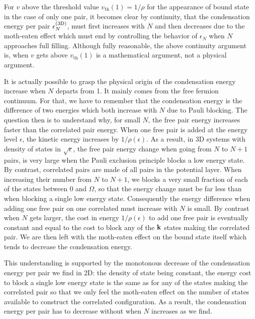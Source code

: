 \documentclass[aps,prb,showpacs,reprint]{revtex4-1}
\begin{document}
\subsubsection{}
For $v$ above the threshold value $v_{\text{th}}(1)=1/\rho$ for the appearance of bound state in the case of only one pair, it becomes  clear by continuity, that the condensation energy per pair $\epsilon^{{\text{(3D)}}}_N$, must first increases with $N$ and then decreases due to the moth-eaten effect which must end by controlling the behavior of $\epsilon_N$ when $N$ approaches full filling.  Although fully reasonable, the above continuity argument is, when $v$ gets above $v_{\text{th}}(1)$ is a mathematical argument, not a physical argument. 

It is actually possible to grasp the physical origin of the condensation energy increase when $N$ departs from 1.  It mainly comes from the free fermion continuum.  For that, we have to remember that the condensation energy is the difference of two energies which both increase with $N$ due to Pauli blocking.  The question then is to understand why, for small $N$, the free pair energy increases faster than the correlated pair energy.  When one free pair is added at the energy level $\epsilon$, the kinetic energy increases by $1/\rho(\epsilon)$.  As a result, in 3D systems with density of states in $\sqrt{\epsilon}$, the free pair energy change when going from $N$ to $N+1$ pairs, is very large when the Pauli exclusion principle blocks a low energy state.  By contrast, correlated pairs are made of all pairs in the potential layer. When increasing their number from $N$ to $N+1$, we blocks a very small fraction of each of the states between $0$ and $\Omega$, so that the energy change must be far less than when blocking a single low energy state.  Consequently the energy difference when adding one free pair on one correlated must increase with $N$ is small. By contrast when $N$ gets larger, the cost in energy $1/\rho(\epsilon)$ to add one free pair is eventually constant and equal to the cost to block any of the $\mathbf{k}$ states making the correlated pair.  We are then left with the moth-eaten effect on the bound state itself which tends to decrease the condensation energy. 

This understanding is supported by the monotonous decrease of the condensation energy per pair we find in 2D: the density of state being constant, the energy cost to block a single low energy state is the same as for any of the states making the correlated pair so that we only feel the moth-eaten effect on the number of states available to construct the correlated configuration.  As a result, the condensation energy per pair has to decrease without when $N$ increases as we find.  
\end{document}
